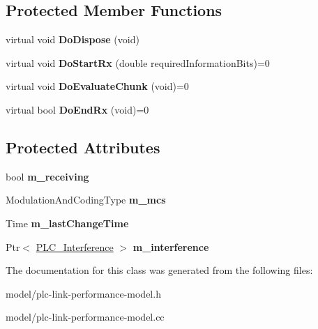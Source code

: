 \subsection*{\-Protected \-Member \-Functions}
\begin{DoxyCompactItemize}
\item 
\hypertarget{classns3_1_1PLC__LinkPerformanceModel_a5051c7e4a3de68b28a7f64afbcc77701}{virtual void {\bfseries \-Do\-Dispose} (void)}\label{classns3_1_1PLC__LinkPerformanceModel_a5051c7e4a3de68b28a7f64afbcc77701}

\item 
\hypertarget{classns3_1_1PLC__LinkPerformanceModel_aa87e7c7b913eb11df941122299f96874}{virtual void {\bfseries \-Do\-Start\-Rx} (double required\-Information\-Bits)=0}\label{classns3_1_1PLC__LinkPerformanceModel_aa87e7c7b913eb11df941122299f96874}

\item 
\hypertarget{classns3_1_1PLC__LinkPerformanceModel_ac0050ee02310a2aa57f746da142cd062}{virtual void {\bfseries \-Do\-Evaluate\-Chunk} (void)=0}\label{classns3_1_1PLC__LinkPerformanceModel_ac0050ee02310a2aa57f746da142cd062}

\item 
\hypertarget{classns3_1_1PLC__LinkPerformanceModel_a7a5e8e08ad2f4dcd57a3a4aa48f1ddd5}{virtual bool {\bfseries \-Do\-End\-Rx} (void)=0}\label{classns3_1_1PLC__LinkPerformanceModel_a7a5e8e08ad2f4dcd57a3a4aa48f1ddd5}

\end{DoxyCompactItemize}
\subsection*{\-Protected \-Attributes}
\begin{DoxyCompactItemize}
\item 
\hypertarget{classns3_1_1PLC__LinkPerformanceModel_a5eef722f3fcdce65e12fe548cb862d9e}{bool {\bfseries m\-\_\-receiving}}\label{classns3_1_1PLC__LinkPerformanceModel_a5eef722f3fcdce65e12fe548cb862d9e}

\item 
\hypertarget{classns3_1_1PLC__LinkPerformanceModel_a97d1adfe95b6c68f26caddc964774e4e}{\-Modulation\-And\-Coding\-Type {\bfseries m\-\_\-mcs}}\label{classns3_1_1PLC__LinkPerformanceModel_a97d1adfe95b6c68f26caddc964774e4e}

\item 
\hypertarget{classns3_1_1PLC__LinkPerformanceModel_a2aa7c2ab56df7f3cf3b19dcbdb11d27c}{\-Time {\bfseries m\-\_\-last\-Change\-Time}}\label{classns3_1_1PLC__LinkPerformanceModel_a2aa7c2ab56df7f3cf3b19dcbdb11d27c}

\item 
\hypertarget{classns3_1_1PLC__LinkPerformanceModel_a5a4a6f8c14309211cefb1b6c075e8f01}{\-Ptr$<$ \hyperlink{classns3_1_1PLC__Interference}{\-P\-L\-C\-\_\-\-Interference} $>$ {\bfseries m\-\_\-interference}}\label{classns3_1_1PLC__LinkPerformanceModel_a5a4a6f8c14309211cefb1b6c075e8f01}

\end{DoxyCompactItemize}


\-The documentation for this class was generated from the following files\-:\begin{DoxyCompactItemize}
\item 
model/plc-\/link-\/performance-\/model.\-h\item 
model/plc-\/link-\/performance-\/model.\-cc\end{DoxyCompactItemize}
